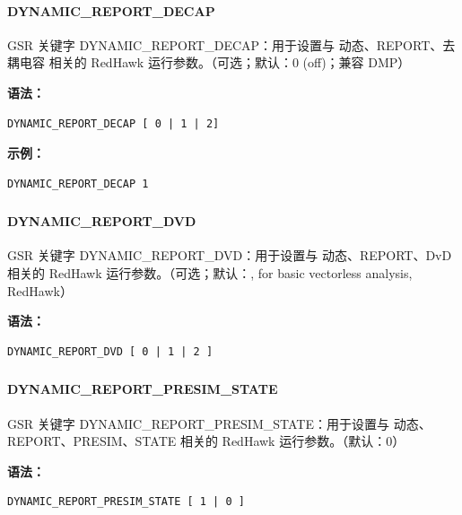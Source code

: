 \paragraph*{DYNAMIC_REPORT_DECAP}

GSR 关键字 DYNAMIC_REPORT_DECAP：用于设置与 动态、REPORT、去耦电容 相关的 RedHawk 运行参数。（可选；默认：0 (off)；兼容 DMP）

\textbf{语法：}
\begin{lstlisting}
DYNAMIC_REPORT_DECAP [ 0 | 1 | 2]
\end{lstlisting}

\textbf{示例：}
\begin{lstlisting}
DYNAMIC_REPORT_DECAP 1
\end{lstlisting}

\subsubsection{}
\paragraph*{DYNAMIC_REPORT_DVD}

GSR 关键字 DYNAMIC_REPORT_DVD：用于设置与 动态、REPORT、DvD 相关的 RedHawk 运行参数。（可选；默认：, for basic vectorless analysis, RedHawk）

\textbf{语法：}
\begin{lstlisting}
DYNAMIC_REPORT_DVD [ 0 | 1 | 2 ]
\end{lstlisting}

\subsubsection{}
\paragraph*{DYNAMIC_REPORT_PRESIM_STATE}

GSR 关键字 DYNAMIC_REPORT_PRESIM_STATE：用于设置与 动态、REPORT、PRESIM、STATE 相关的 RedHawk 运行参数。（默认：0）

\textbf{语法：}
\begin{lstlisting}
DYNAMIC_REPORT_PRESIM_STATE [ 1 | 0 ]
\end{lstlisting}

\subsubsection{}
